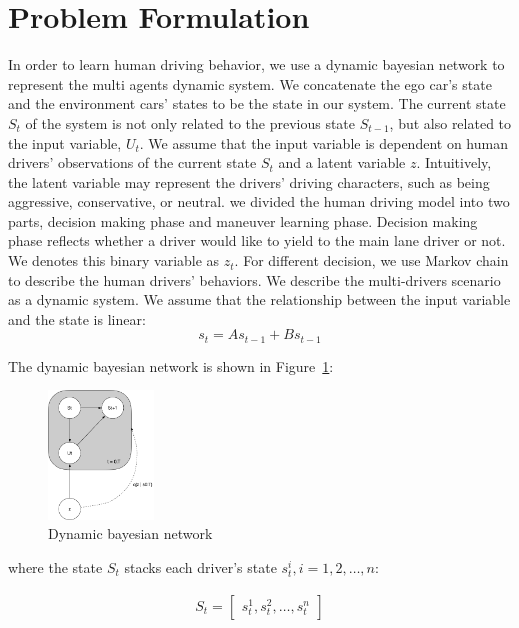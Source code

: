 \documentclass[conference]{IEEEtran}
\begin{document}
\section{Problem Formulation}
In order to learn human driving behavior, we use a dynamic bayesian network to represent the multi agents dynamic system. We concatenate the ego car's state and the environment cars' states to be the state in our system. The current state $S_t$ of the system is not only related to the previous state $S_{t-1}$, but also related to the input variable, $U_t$. We assume that the input variable is dependent on human drivers' observations of the current state $S_t$ and a latent variable $z$. Intuitively, the latent variable may represent the drivers' driving characters, such as being aggressive, conservative, or neutral. we divided the human driving model into two parts, decision making phase and maneuver learning phase. Decision making phase reflects whether a driver would like to yield to the main lane driver or not. We denotes this binary variable as $z_t$. For different decision, we use Markov chain to describe the human drivers' behaviors. We describe the multi-drivers scenario as a dynamic system. We assume that the relationship between the input variable and the state is linear:
\begin{equation}
s_{t} = As_{t-1} + Bs_{t-1}
\end{equation}

The dynamic bayesian network is shown in Figure~\ref{fig:dbn}:

\begin{figure}[H]
	\centering
	\includegraphics[width = 0.25\textwidth]{dbn.png}
	\caption{Dynamic bayesian network}
	\label{fig:dbn}
\end{figure}


where the state $S_{t}$ stacks each driver's state $s_{t}^{i}, i = 1, 2, \dots, n$:

\begin{align}
S_{t}=
\begin{bmatrix}
s_{t}^{1}, s_{t}^{2}, \dots, s_{t}^{n}
\end{bmatrix}
\end{align}
\end{document}
